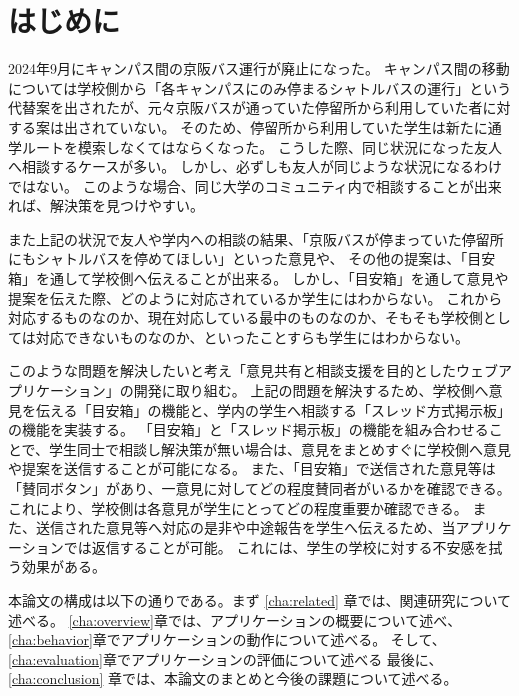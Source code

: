 \documentclass[main]{subfiles}
\begin{document}
\chapter{はじめに}
\label{cha:intro}

2024年9月にキャンパス間の京阪バス運行が廃止になった。
キャンパス間の移動については学校側から「各キャンパスにのみ停まるシャトルバスの運行」という代替案を出されたが、元々京阪バスが通っていた停留所から利用していた者に対する案は出されていない。
そのため、停留所から利用していた学生は新たに通学ルートを模索しなくてはならくなった。
こうした際、同じ状況になった友人へ相談するケースが多い。
しかし、必ずしも友人が同じような状況になるわけではない。
このような場合、同じ大学のコミュニティ内で相談することが出来れば、解決策を見つけやすい。

また上記の状況で友人や学内への相談の結果、「京阪バスが停まっていた停留所にもシャトルバスを停めてほしい」といった意見や、
その他の提案は、「目安箱」を通して学校側へ伝えることが出来る。
しかし、「目安箱」を通して意見や提案を伝えた際、どのように対応されているか学生にはわからない。
これから対応するものなのか、現在対応している最中のものなのか、そもそも学校側としては対応できないものなのか、といったことすらも学生にはわからない。

このような問題を解決したいと考え「意見共有と相談支援を目的としたウェブアプリケーション」の開発に取り組む。
上記の問題を解決するため、学校側へ意見を伝える「目安箱」の機能と、学内の学生へ相談する「スレッド方式掲示板」の機能を実装する。
「目安箱」と「スレッド掲示板」の機能を組み合わせることで、学生同士で相談し解決策が無い場合は、意見をまとめすぐに学校側へ意見や提案を送信することが可能になる。
また、「目安箱」で送信された意見等は「賛同ボタン」があり、一意見に対してどの程度賛同者がいるかを確認できる。
これにより、学校側は各意見が学生にとってどの程度重要か確認できる。
また、送信された意見等へ対応の是非や中途報告を学生へ伝えるため、当アプリケーションでは返信することが可能。
これには、学生の学校に対する不安感を拭う効果がある。


本論文の構成は以下の通りである。まず \ref{cha:related} 章では、関連研究について述べる。
\ref{cha:overview}章では、アプリケーションの概要について述べ、
\ref{cha:behavior}章でアプリケーションの動作について述べる。
そして、\ref{cha:evaluation}章でアプリケーションの評価について述べる
最後に、\ref{cha:conclusion} 章では、本論文のまとめと今後の課題について述べる。
\end{document}
